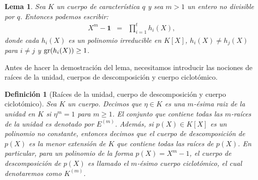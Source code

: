 \documentclass[10pt]{article}
\newcommand{\0}{\mathbf{0}}
\newcommand{\1}{\mathbf{1}}
\newcommand{\+}{\oplus}
\newcommand{\comentarioin}[1]{}
\newtheorem{lemma}[theorem]{Lema}
\newtheorem{definition}[theorem]{Definición}
\theoremstyle{remark}
\theoremstyle{remark}
\newcommand{\grado}{{\rm gr}}
\begin{document}
	\begin{lemma}\label{lema-polinomio_separable}
		Sea $K$ un cuerpo de característica $q$ y sea $m>1$
                un entero no divisible por $q$.
                Entonces podemos escribir:
	\begin{eqnarray*}
		X^m-\1 & = & \prod_{i=1}^{t}h_i(X), 
		\end{eqnarray*}
		donde cada $h_i(X)$ es un polinomio irreducible en $K[X]$,
$h_i(X)\neq h_j(X)$ para $i\neq j$ y $\grado(h_i(X)) \geq 1$.		 
	\end{lemma}
Antes de hacer la demostración del lema, necesitamos introducir las
nociones de raíces de la unidad, cuerpos de descomposición y cuerpo
ciclotómico.        
\begin{definition}[Raíces de la unidad, cuerpo de descomposición y cuerpo ciclotómico]\label{c. de descomposicion, ciclotomico def}
Sea $K$ un cuerpo. Decimos que $\eta\in K$ es una $m$-ésima raiz de la
unidad en $K$ si $\eta^m=1$ para $m\geq 1$. El conjunto que contiene
todas las $m$-raíces de la unidad es denotado por $E^{(m)}$.  Además,
si $p(X)\in K[X]$ es un polinomio no constante, entonces decimos que
el cuerpo de descomposición de $p(X)$ es la menor extensión de $K$ que
contiene todas las raíces de $p(X)$. En particular, para un polinomio
de la forma $p(X)=X^m-1$, el cuerpo de descomposición de $p(X)$ es
llamado
el $m$-ésimo cuerpo ciclotómico, el cual denotaremos como $K^{(m)}$.
\end{definition}
\end{document}
